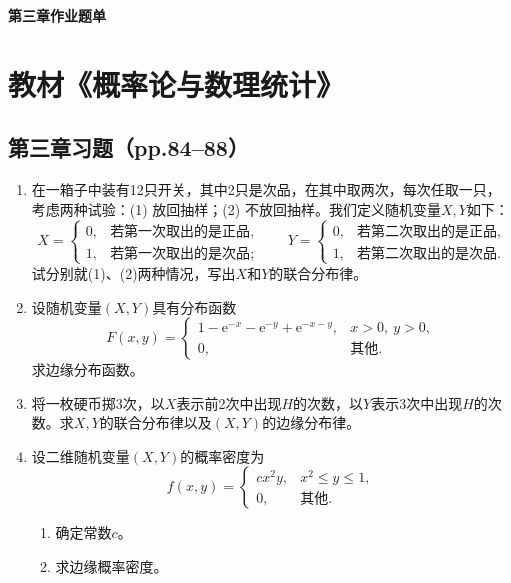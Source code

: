 \documentclass[UTF8]{ctexart}
\begin{document}
\begin{center}
\LARGE\bfseries 第三章作业题单
\end{center}

\section*{教材《概率论与数理统计》}

\subsection*{第三章习题（pp.84--88）}

\begin{enumerate}
\renewcommand{\labelenumi}{\textbf{\arabic{enumi}.}}
\item 在一箱子中装有12只开关，其中2只是次品，在其中取两次，每次任取一只，考虑两种试验：(1) 放回抽样；(2) 不放回抽样。我们定义随机变量$X,Y$如下：
\[
X=\begin{cases}
0, & \text{若第一次取出的是正品},\\[2pt]
1, & \text{若第一次取出的是次品};
\end{cases}
\qquad
Y=\begin{cases}
0, & \text{若第二次取出的是正品},\\[2pt]
1, & \text{若第二次取出的是次品}.
\end{cases}
\]
试分别就(1)、(2)两种情况，写出$X$和$Y$的联合分布律。

\setcounter{enumi}{4}
\item 设随机变量$(X,Y)$具有分布函数
\[
F(x,y)=
\begin{cases}
1-\mathrm{e}^{-x}-\mathrm{e}^{-y}+\mathrm{e}^{-x-y}, & x>0,\ y>0,\\[4pt]
0, & \text{其他}.
\end{cases}
\]
求边缘分布函数。

\item 将一枚硬币掷3次，以$X$表示前2次中出现$H$的次数，以$Y$表示3次中出现$H$的次数。求$X,Y$的联合分布律以及$(X,Y)$的边缘分布律。

\setcounter{enumi}{8}
\item 设二维随机变量$(X,Y)$的概率密度为
\[
f(x,y)=
\begin{cases}
cx^{2}y, & x^{2}\le y\le 1,\\[4pt]
0, & \text{其他}.
\end{cases}
\]
\begin{enumerate}
\item[(1)] 确定常数$c$。
\item[(2)] 求边缘概率密度。
\end{enumerate}


\end{enumerate}
\end{document}
